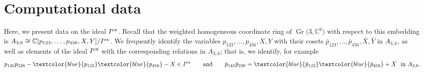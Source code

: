 \documentclass[pdftex]{sigma}%
\numberwithin{equation}{section}
\DeclareMathOperator{\Gr}{Gr}
\begin{document}
\section{Computational data}\label{sec:data Gr36}
Here, we present data on the ideal $I^{\rm ex}$.
Recall that the weighted homogeneous coordinate ring of $\Gr\big(3,\mathbb C^6\big)$ with respect to this embedding is $A_{3,6}\cong \mathbb C[p_{123},\dots,p_{456},X,Y]/I^{\rm ex}$.
We frequently identify the variables $p_{123},\dots,p_{456},X,Y$ with their cosets $\bar p_{123},\dots,\bar p_{456},\bar X,\bar Y$ in $A_{3,6}$, as well as elements of the ideal $I^{\rm ex}$ with the corresponding relations in $A_{3,6}$; that is, we identify, for example
\begin{displaymath}
p_{145}p_{236} - \textcolor{blue}{p_{123}}\textcolor{blue}{p_{456}} - X \in I^{\rm ex} \qquad \text{and} \qquad \bar p_{145}\bar p_{236} = \textcolor{blue}{\bar p_{123}}\textcolor{blue}{\bar p_{456}} + \bar X \ \text{ in } A_{3,6}.
\end{displaymath}
\end{document}
